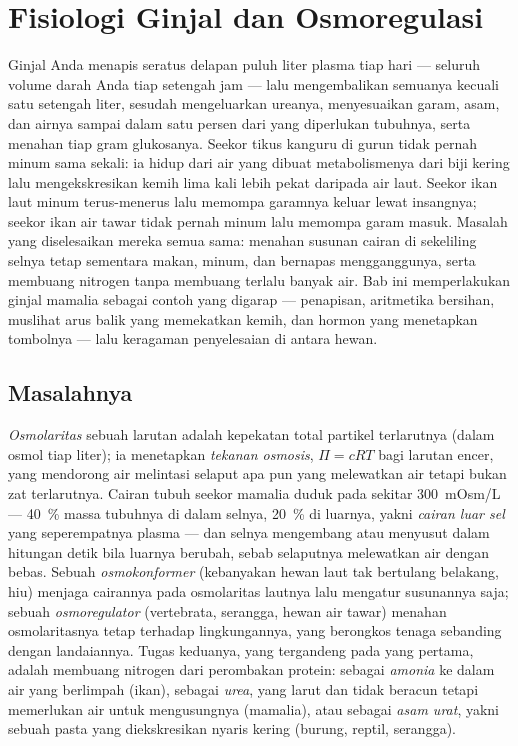 \chapter{Fisiologi Ginjal dan Osmoregulasi}\label{ch:b3:renal-osmoregulation}

Ginjal Anda menapis seratus delapan puluh liter plasma tiap hari ---
seluruh volume darah Anda tiap setengah jam --- lalu mengembalikan semuanya
kecuali satu setengah liter, sesudah mengeluarkan ureanya, menyesuaikan garam,
asam, dan airnya sampai dalam satu persen dari yang diperlukan tubuhnya, serta
menahan tiap gram glukosanya. Seekor tikus kanguru di gurun tidak pernah minum
sama sekali: ia hidup dari air yang dibuat metabolismenya dari biji kering lalu
mengekskresikan kemih lima kali lebih pekat daripada air laut. Seekor ikan laut
minum terus-menerus lalu memompa garamnya keluar lewat insangnya; seekor ikan
air tawar tidak pernah minum lalu memompa garam masuk. Masalah yang
diselesaikan mereka semua sama: menahan susunan cairan di sekeliling
selnya tetap sementara makan, minum, dan bernapas
mengganggunya, serta membuang nitrogen tanpa membuang terlalu banyak
air. Bab ini memperlakukan ginjal mamalia sebagai contoh yang digarap
--- penapisan, aritmetika bersihan, muslihat arus balik
yang memekatkan kemih, dan hormon yang menetapkan
tombolnya --- lalu keragaman penyelesaian di antara hewan.

\section{Masalahnya}

\begin{definition}[Osmoregulasi]\label{def:b3:renal-osmoregulation:problem}
%
\emph{Osmolaritas} sebuah larutan adalah kepekatan total partikel
terlarutnya (dalam osmol tiap liter); ia menetapkan \emph{tekanan
osmosis}, $\Pi = cRT$ bagi larutan encer, yang mendorong air melintasi
selaput apa pun yang melewatkan air tetapi bukan zat terlarutnya. Cairan tubuh seekor mamalia
duduk pada sekitar \qty{300}{mOsm/L} --- \qty{40}{\%} massa tubuhnya di dalam
selnya, \qty{20}{\%} di luarnya, yakni \emph{cairan luar sel} yang
seperempatnya plasma --- dan selnya mengembang atau menyusut dalam hitungan detik bila
luarnya berubah, sebab selaputnya melewatkan air dengan bebas. Sebuah
\emph{osmokonformer} (kebanyakan hewan laut tak bertulang belakang, hiu) menjaga
cairannya pada osmolaritas lautnya lalu mengatur susunannya saja;
sebuah \emph{osmoregulator} (vertebrata, serangga,
hewan air tawar) menahan osmolaritasnya tetap terhadap
lingkungannya, yang berongkos tenaga sebanding dengan landaiannya.
Tugas keduanya, yang tergandeng pada yang pertama, adalah membuang nitrogen dari
perombakan protein: sebagai \emph{amonia} ke dalam air yang berlimpah (ikan), sebagai
\emph{urea}, yang larut dan tidak beracun tetapi memerlukan air untuk mengusungnya
(mamalia), atau sebagai \emph{asam urat}, yakni sebuah pasta yang diekskresikan nyaris kering (burung,
reptil, serangga).
\end{definition}

